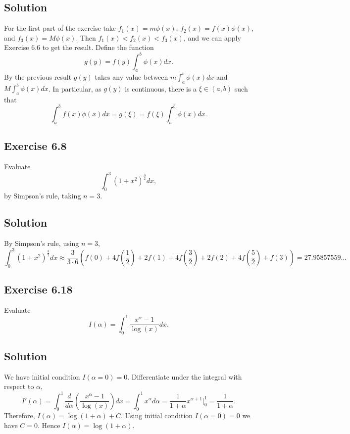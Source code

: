 \subsection*{Solution}

For the first part of the exercise take $f_1(x) = m \phi(x)$, $f_2(x) = f(x) \phi(x)$, and $f_3(x) = M \phi(x)$.
Then $f_1(x) < f_2(x) < f_3(x)$, and we can apply Exercise 6.6 to get the result.
Define the function
\begin{equation*}
    g(y) = f(y) \int_a^b \phi(x) dx.
\end{equation*}
By the previous result $g(y)$ takes any value between $m \int_a^b \phi(x) dx$ and $M \int_a^b \phi(x) dx$.
In particular, as $g(y)$ is continuous, there is a $\xi \in (a, b)$ such that
\begin{equation*}
    \int_a^b f(x) \phi(x) dx = g(\xi) = f(\xi) \int_a^b \phi(x) dx.
\end{equation*}


\subsection*{Exercise 6.8}

Evaluate
\begin{equation*}
    \int_0^3 (1 + x^2)^{\frac{3}{2}} dx,
\end{equation*}
by Simpson's rule, taking $n = 3$.

\subsection*{Solution}
By Simpson's rule, using $n = 3$,
\begin{equation*}
    \int_0^3 (1 + x^2)^{\frac{3}{2}} dx
        \approx \frac{3}{3 \cdot 6} \left(f(0) + 4f\left(\frac{1}{2}\right) + 2f(1) + 4f\left(\frac{3}{2}\right) + 2f(2) + 4f\left(\frac{5}{2}\right) + f(3)\right)
        = 27.95857559...
\end{equation*}


\subsection*{Exercise 6.18}

Evaluate
\begin{equation*}
    I(\alpha) = \int_0^1 \frac{x^{\alpha} - 1}{\log(x)} dx.
\end{equation*}

\subsection*{Solution}

We have initial condition $I(\alpha = 0) = 0$.
Differentiate under the integral with respect to $\alpha$,
\begin{equation*}
    I'(\alpha) = \int_0^1 \frac{d}{d\alpha} \left( \frac{x^{\alpha} - 1}{\log(x)} \right) dx
        = \int_0^1 x^{\alpha} d\alpha
        = \frac{1}{1 + \alpha} x^{\alpha+1} \Biggr|_0^1
        = \frac{1}{1 + \alpha}.
\end{equation*}
Therefore, $I(\alpha) = \log(1 + \alpha) + C$.
Using initial condition $I(\alpha = 0) = 0$ we have $C = 0$.
Hence $I(\alpha) = \log(1 + \alpha)$.

